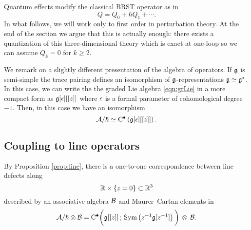 \documentclass[11pt]{amsart}
\begin{document}
Quantum effects modify the classical BRST operator as in
\[
Q = Q_0 + \hbar Q_1 + \cdots .
\]
In what follows, we will work only to first order in perturbation theory. 
At the end of the section we argue that this is actually enough: there exists a quantization of this three-dimensional theory which is exact at one-loop so we can assume $Q_k = 0$ for $k \geq 2$. 

We remark on a slightly different presentation of the algebra of operators. 
If $\mathfrak g$ is semi-simple the trace pairing defines an isomorphism of $\mathfrak g$-representations $\mathfrak g \simeq \mathfrak g^*$. 
In this case, we can write the the graded Lie algebra \eqref{eqn:grLie} in a more compact form as $\mathfrak g[\epsilon] [[z]]$ where $\epsilon$ is a formal parameter of cohomological degree $-1$. 
Then, in this case we have an isomorphism
\[
\mathcal A / \hbar \simeq {\rm C}^\bullet \left(\mathfrak g[\epsilon][[z]]\right) .
\]


%
%


\subsection{Coupling to line operators}

By Proposition \ref{prop:line}, there is a one-to-one correspondence between line defects along
\[
\mathbb R \times \{z=0\} \subset \mathbb R^3 
\]
described by an associative algebra $\mathcal B$ and Maurer--Cartan elements in 
\begin{equation}\label{eqn:criticalobs}
\mathcal A / \hbar \otimes \mathcal B = {\rm C}^\bullet \bigg(\mathfrak g[[z]] \, ; \, \operatorname{Sym} \left(z^{-1} \mathfrak g[z^{-1}]\right) \bigg) \, \otimes  \, \mathcal B .
\end{equation}
\end{document}
